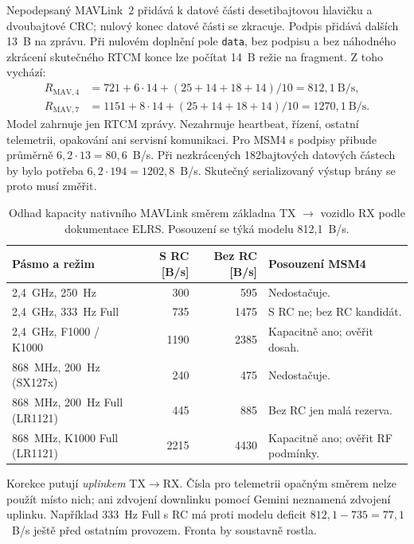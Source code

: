 \documentclass[11pt,a4paper]{article}
\begin{document}
Nepodepsaný MAVLink~2 přidává k datové části desetibajtovou hlavičku a dvoubajtové CRC; nulový konec datové části se zkracuje. Podpis přidává dalších 13~B na zprávu.\cite{mavserial} Při nulovém doplnění pole \texttt{data}, bez podpisu a bez náhodného zkrácení skutečného RTCM konce lze počítat 14~B režie na fragment. Z toho vychází:
\begin{align}
 R_{\mathrm{MAV,4}} &=721+6\cdot14+(25+14+18+14)/10
                  =812{,}1~\mathrm{B/s},\\
 R_{\mathrm{MAV,7}} &=1151+8\cdot14+(25+14+18+14)/10
                  =1270{,}1~\mathrm{B/s}.
\end{align}
Model zahrnuje jen RTCM zprávy. Nezahrnuje heartbeat, řízení, ostatní telemetrii, opakování ani servisní komunikaci. Pro MSM4 s podpisy přibude průměrně $6{,}2\cdot13=80{,}6$~B/s. Při nezkrácených 182bajtových datových částech by bylo potřeba $6{,}2\cdot194=1202{,}8$~B/s. Skutečný serializovaný výstup brány se proto musí změřit.

\par
\begin{table}[htbp]\centering\small
\caption{Odhad kapacity nativního MAVLink směrem základna TX $\rightarrow$ vozidlo RX podle dokumentace ELRS. Posouzení se týká modelu 812,1~B/s.\cite{mavlink}}
\begin{tabularx}{\linewidth}{YrrY}
\toprule Pásmo a režim & S RC [B/s] & Bez RC [B/s] & Posouzení MSM4\\ ,4~GHz, 250~Hz & 300 & 595 & Nedostačuje.\\
2,4~GHz, 333~Hz Full & 735 & 1475 & S RC ne; bez RC kandidát.\\
2,4~GHz, F1000 / K1000 & 1190 & 2385 & Kapacitně ano; ověřit dosah.\\
868~MHz, 200~Hz (SX127x) & 240 & 475 & Nedostačuje.\\
868~MHz, 200~Hz Full (LR1121) & 445 & 885 & Bez RC jen malá rezerva.\\
868~MHz, K1000 Full (LR1121) & 2215 & 4430 & Kapacitně ano; ověřit RF podmínky.\\
\bottomrule\end{tabularx}
\end{table}
\par
Korekce putují \emph{uplinkem} TX$\rightarrow$RX. Čísla pro telemetrii opačným směrem nelze použít místo nich; ani zdvojení downlinku pomocí Gemini neznamená zdvojení uplinku.\cite{mavlink} Například 333~Hz Full s RC má proti modelu deficit $812{,}1-735=77{,}1$~B/s ještě před ostatním provozem. Fronta by soustavně rostla.
\end{document}
